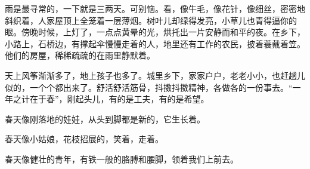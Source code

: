 \documentclass[letterpaper,12pt,english]{sphinxmanual}
\begin{document}
雨是最寻常的，一下就是三两天。可别恼。看，像牛毛，像花针，像细丝，密密地斜织着，人家屋顶上全笼着一层薄烟。树叶儿却绿得发亮，小草儿也青得逼你的眼。傍晚时候，上灯了，一点点黄晕的光，烘托出一片安静而和平的夜。在乡下，小路上，石桥边，有撑起伞慢慢走着的人，地里还有工作的农民，披着蓑戴着笠。他们的房屋，稀稀疏疏的在雨里静默着。

天上风筝渐渐多了，地上孩子也多了。城里乡下，家家户户，老老小小，也赶趟儿似的，一个个都出来了。舒活舒活筋骨，抖擞抖擞精神，各做各的一份事去。“一年之计在于春”，刚起头儿，有的是工夫，有的是希望。

春天像刚落地的娃娃，从头到脚都是新的，它生长着。

春天像小姑娘，花枝招展的，笑着，走着。

春天像健壮的青年，有铁一般的胳膊和腰脚，领着我们上前去。
\end{document}
